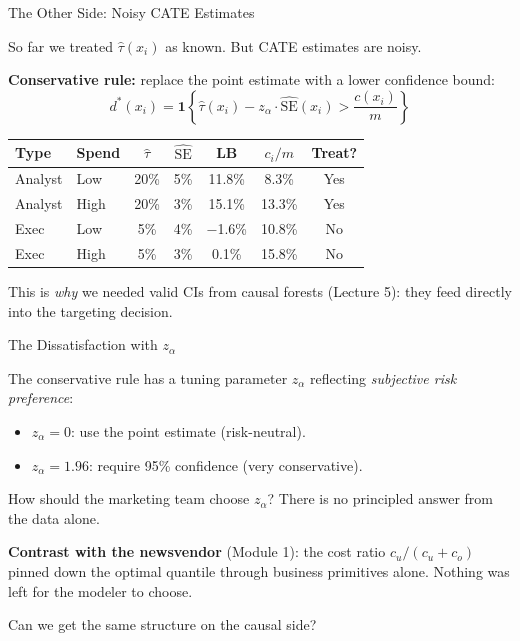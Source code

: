 \documentclass[aspectratio=169, 11pt, handout]{beamer}
\newcommand{\SE}{\mathrm{SE}}
\begin{document}
\begin{frame}{The Other Side: Noisy CATE Estimates}
 
So far we treated $\hat{\tau}(x_i)$ as known. But CATE estimates are noisy.
 
\medskip
 
\textbf{Conservative rule:} replace the point estimate with a lower confidence bound:
\[
d^*(x_i) = \mathbf{1}\left\{\hat{\tau}(x_i) - z_\alpha \cdot \widehat{\SE}(x_i) > \frac{c(x_i)}{m}\right\}
\]
 
\pause
\medskip
 
\begin{center}
\small
\begin{tabular}{llccccc}
\toprule
\textbf{Type} & \textbf{Spend} & $\hat{\tau}$ & $\widehat{\SE}$ & LB & $c_i/m$ & \textbf{Treat?} \\
\midrule
Analyst & Low  & 20\% & 5\% & 11.8\% & 8.3\% & \textcolor{sbgreen}{Yes} \\
Analyst & High & 20\% & 3\% & 15.1\% & 13.3\% & \textcolor{sbgreen}{Yes} \\
Exec & Low  & 5\% & 4\% & $-$1.6\% & 10.8\% & \textcolor{warnred}{No} \\
Exec & High & 5\% & 3\% & 0.1\% & 15.8\% & \textcolor{warnred}{No} \\
\bottomrule
\end{tabular}
\end{center}
 
\pause
\medskip
 
This is \emph{why} we needed valid CIs from causal forests (Lecture 5): they feed directly into the targeting decision.
 
\end{frame}
 
 
\begin{frame}{The Dissatisfaction with $z_\alpha$}
 
The conservative rule has a tuning parameter $z_\alpha$ reflecting \emph{subjective risk preference}:
 
\begin{itemize}
    \item $z_\alpha = 0$: use the point estimate (risk-neutral).
    \item $z_\alpha = 1.96$: require 95\% confidence (very conservative).
\end{itemize}
 
\pause
\bigskip
 
How should the marketing team choose $z_\alpha$? There is no principled answer from the data alone.
 
\pause
\bigskip
 
\textbf{Contrast with the newsvendor} (Module 1): the cost ratio $c_u/(c_u + c_o)$ pinned down the optimal quantile through business primitives alone. Nothing was left for the modeler to choose.
 
\medskip
 
Can we get the same structure on the causal side?
 
\end{frame}
 
\end{document}
